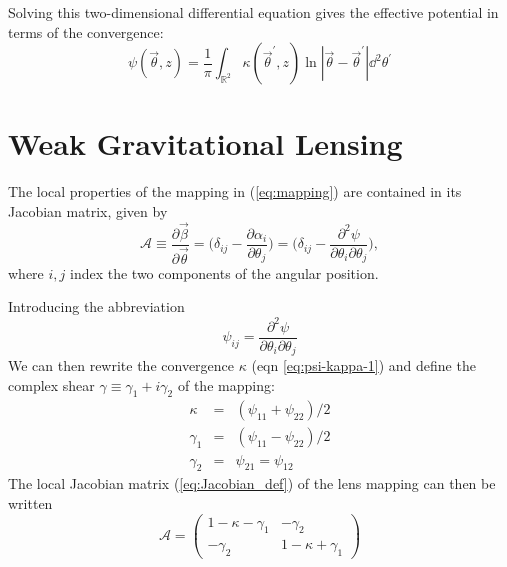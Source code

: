 Solving this two-dimensional differential equation gives the effective potential in terms of the convergence:
\begin{equation}
  \label{eq:psi-kappa}
  \psi(\vec{\theta},z) 
  = \frac{1}{\pi}\int_{\mathbb{R}^2} \kappa(\vec{\theta}^\prime,z) 
  \ln|\vec{\theta} - \vec{\theta}^\prime|\dd^2\theta^\prime
\end{equation}

\section{Weak Gravitational Lensing}

The local properties of the mapping in (\ref{eq:mapping}) are contained in its Jacobian matrix, given by
\begin{equation}
  \label{eq:Jacobian_def}
  \mathcal{A} \equiv \frac{\partial \vec{\beta}}{\partial \vec{\theta}} = \Big(\delta_{ij} - \frac{\partial \alpha_i}{\partial \theta_j} \Big) = \Big(\delta_{ij} - \frac{\partial^2 \psi}{\partial \theta_i \partial \theta_j} \Big),
\end{equation}
where $i,j$ index the two components of the angular position.

Introducing the abbreviation
\begin{equation}
  \label{eq:psi_ij}
  \psi_{ij} = \frac{\partial^2 \psi}{\partial \theta_i \partial \theta_j}
\end{equation}
We can then rewrite the convergence $\kappa$ (eqn \ref{eq:psi-kappa-1}) and define the complex shear $\gamma \equiv \gamma_1 + i\gamma_2$ of the mapping:
\begin{equation}
  \label{eq:gamma-def}
  \begin{array}{lcl}
    \kappa & = & (\psi_{11} + \psi_{22})/2\\
    \gamma_1 & = & (\psi_{11} - \psi_{22})/2\\
    \gamma_2 & = & \psi_{21} = \psi_{12}
  \end{array}
\end{equation}
The local Jacobian matrix (\ref{eq:Jacobian_def}) of the lens mapping can then be written
\begin{equation}
  \label{eq:jacobian_kappa_gamma}
  \mathcal{A} = \left(
  \begin{array}{cc}
    1 - \kappa - \gamma_1 & -\gamma_2\\
    -\gamma_2             & 1-\kappa+\gamma_1
  \end{array}\right)
\end{equation}

